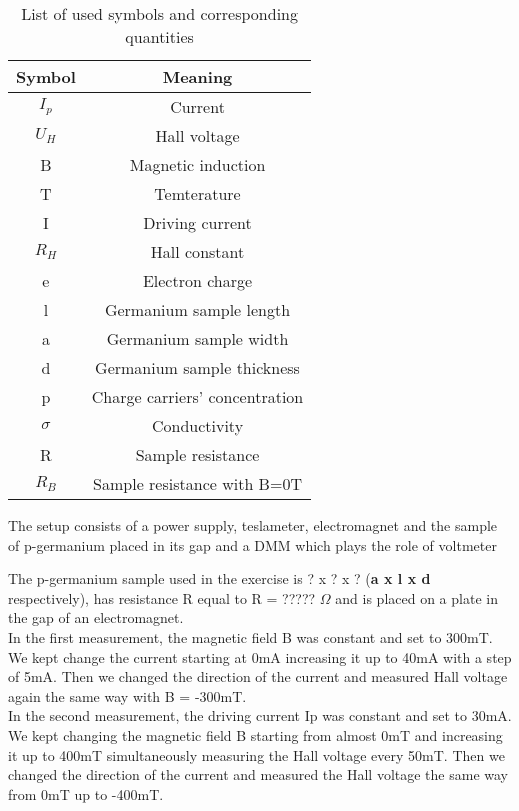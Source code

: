 \documentclass[a4paper,12pt]{article}
\begin{document}
\begin{table}[H]
\begin{center}
\caption{List of used symbols and corresponding quantities}
\begin{tabular}{|c|c|}
\hline
Symbol & Meaning\\
\hline
\hline
$I_p$ & Current\\
\hline
$U_H$ & Hall voltage\\
\hline
B & Magnetic induction\\
\hline
T & Temterature\\
\hline
I & Driving current\\
\hline
$R_H$ & Hall constant\\
\hline
e & Electron charge\\
\hline
l & Germanium sample length\\
\hline
a & Germanium sample width\\
\hline
d & Germanium sample thickness\\
\hline
p & Charge carriers' concentration\\
\hline
$\sigma$ & Conductivity\\
\hline
R & Sample resistance\\
\hline
$R_B$ & Sample resistance with B=0T\\
\hline
\end{tabular}
\end{center}
\end{table}


The setup consists of a power supply, teslameter,
electromagnet and the sample of p-germanium placed in its gap and a DMM which plays the role of voltmeter

The p-germanium sample used in the exercise is ? x ? x ? (\textbf{a x l x d} respectively),
has resistance R equal to R = ????? $\Omega$ and is placed on a plate in the gap of an electromagnet. \\

In the first measurement, the magnetic field B was constant and set to 300mT. We kept change the current starting at 0mA increasing it up to 40mA with a step of 5mA. Then we changed the direction of the current and measured Hall voltage again the same way with B = -300mT.\\

In the second measurement, the driving current Ip was constant and set to 30mA. We kept changing the magnetic field B starting from almost 0mT and increasing it up to 400mT simultaneously measuring the Hall voltage every 50mT. Then we changed the direction of the current and measured the Hall voltage the same way from 0mT up to -400mT.
\end{document}
